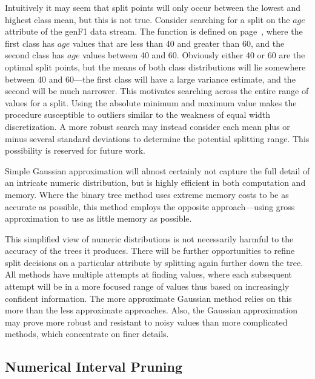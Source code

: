 Intuitively it may seem that split points will only occur between the lowest and highest class mean, but this is not true. Consider searching for a split on the $age$ attribute of the {\sc genF1} data stream. The function is defined on page~\pageref{fig:agrawalFuncs1}, where the first class has $age$ values that are less than 40 and greater than 60, and the second class has $age$ values between 40 and 60. Obviously either 40 or 60 are the optimal split points, but the means of both class distributions will lie somewhere between 40 and 60---the first class will have a large variance estimate, and the second will be much narrower. This motivates searching across the entire range of values for a split. Using the absolute minimum and maximum value makes the procedure susceptible to outliers similar to the weakness of equal width discretization. A more robust search may instead consider each mean plus or minus several standard deviations to determine the potential splitting range. This possibility is reserved for future work.

Simple Gaussian approximation will almost certainly not capture the full detail of an intricate numeric distribution, but is highly efficient in both computation and memory. Where the binary tree method uses extreme memory costs to be as accurate as possible, this method employs the opposite approach---using gross approximation to use as little memory as possible.

This simplified view of numeric distributions is not necessarily harmful to the accuracy of the trees it produces. There will be further opportunities to refine split decisions on a particular attribute by splitting again further down the tree.
All methods have multiple attempts at finding values,
where each subsequent attempt will be in a more focused range of values thus based on increasingly confident information.
The more approximate Gaussian method relies on this more than the less
approximate approaches. Also, the Gaussian approximation
may prove more robust and resistant to noisy values than more complicated methods, which concentrate on finer details.

\subsection{Numerical Interval Pruning}
\label{sec:nip}


